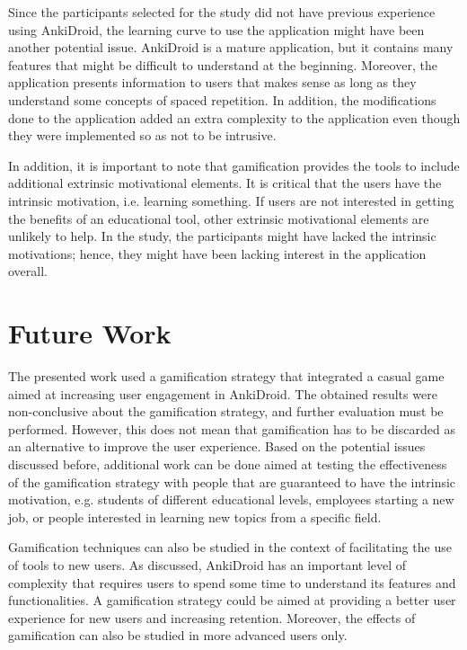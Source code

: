 Since the participants selected for the study did not have previous experience using AnkiDroid, the learning curve to use the application might have been another potential issue. AnkiDroid is a mature application, but it contains many features that might be difficult to understand at the beginning. Moreover, the application presents information to users that makes sense as long as they understand some concepts of spaced repetition. In addition, the modifications done to the application added an extra complexity to the application even though they were implemented so as not to be intrusive.

In addition, it is important to note that gamification provides the tools to include additional extrinsic motivational elements. It is critical that the users have the intrinsic motivation, i.e. learning something. If users are not interested in getting the benefits of an educational tool, other extrinsic motivational elements are unlikely to help. In the study, the participants might have lacked the intrinsic motivations; hence, they might have been lacking interest in the application overall.

\section{Future Work}
The presented work used a gamification strategy that integrated a casual game aimed at increasing user engagement in AnkiDroid. The obtained results were non-conclusive about the gamification strategy, and further evaluation must be performed. However, this does not mean that gamification has to be discarded as an alternative to improve the user experience. Based on the potential issues discussed before, additional work can be done aimed at testing the effectiveness of the gamification strategy with people that are guaranteed to have the intrinsic motivation, e.g. students of different educational levels, employees starting a new job, or people interested in learning new topics from a specific field.

Gamification techniques can also be studied in the context of facilitating the use of tools to new users. As discussed, AnkiDroid has an important level of complexity that requires users to spend some time to understand its features and functionalities. A gamification strategy could be aimed at providing a better user experience for new users and increasing retention. Moreover, the effects of gamification can also be studied in more advanced users only.